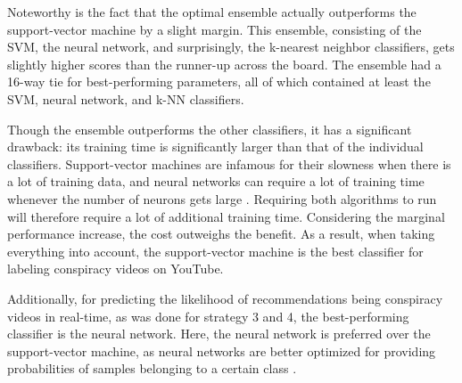 \documentclass[../main.tex]{subfiles}
\begin{document}
Noteworthy is the fact that the optimal ensemble actually outperforms the support-vector machine by a
slight margin. This ensemble, consisting of the SVM, the neural network, and surprisingly, the k-nearest
neighbor classifiers, gets slightly higher scores than the runner-up across the board. The ensemble had
a 16-way tie for best-performing parameters, all of which contained at least the SVM, neural network,
and k-NN classifiers. 

Though the ensemble outperforms the other classifiers, it has a significant drawback: its training time
is significantly larger than that of the individual classifiers. Support-vector machines are infamous
for their slowness when there is a lot of training data, and neural networks can require a lot of
training time whenever the number of neurons gets large \citep{burges1997improving,
kamarthi1999accelerating}. Requiring both algorithms to run will therefore require a lot of additional
training time. Considering the marginal performance increase, the cost outweighs the benefit. As a
result, when taking everything into account, the support-vector machine is the best classifier for
labeling conspiracy videos on YouTube.

Additionally, for predicting the likelihood of recommendations being conspiracy videos in real-time, as was 
done for strategy 3 and 4, the best-performing classifier is the neural network. Here, the neural network is
preferred over the support-vector machine, as neural networks are better optimized for providing 
probabilities of samples belonging to a certain class \citep{specht1990probabilistic}.
\end{document}
